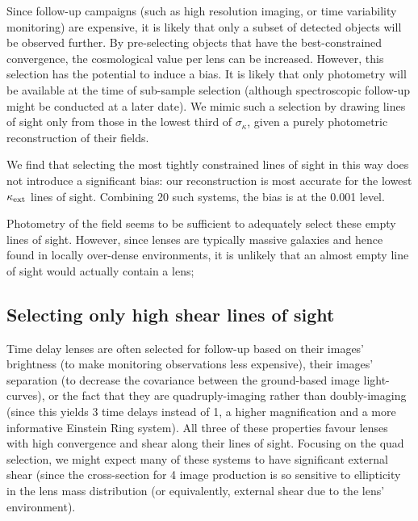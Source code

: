 \documentclass[useAMS,usenatbib,a4paper]{mn2e}
\begin{document}
Since follow-up campaigns (such as high resolution imaging, or time
variability monitoring) are expensive, it is likely that only a subset of
detected objects will be observed further. By pre-selecting objects that have 
the best-constrained convergence, the cosmological value per lens can be
increased. However, this selection 
has the potential to induce a bias. It is
likely that only photometry will be available at the time of sub-sample
selection (although spectroscopic follow-up might be conducted at a later
date). We mimic such a selection by drawing lines of sight only from those in
the lowest third of $\sigma_{\kappa}$, given a purely photometric
reconstruction of their fields. 

We find that selecting the most tightly constrained lines of sight in this way
does not introduce a significant bias:  our reconstruction is most accurate
for the lowest $\kappa_{\rm ext}$ lines of sight. Combining 20 such systems, the bias
is at the 0.001 level.

Photometry of the field seems to be sufficient to adequately select these
empty lines of sight.  However, 
since lenses are typically massive galaxies and hence found in locally over-dense
environments, it is unlikely that  an almost empty line of sight would
actually  contain a lens; 


\subsection{Selecting only high shear lines of sight}
\label{sec:bias:tightPDF}

Time delay lenses are often selected for follow-up based on their images'
brightness (to make monitoring observations less expensive), their images'
separation (to decrease the covariance between the ground-based image
light-curves), or the fact that they are quadruply-imaging rather than
doubly-imaging (since this yields 3 time delays instead of 1, a higher
magnification and a more informative Einstein Ring system). All three of these
properties favour lenses with high convergence and shear along their lines of
sight. Focusing on the quad selection, we might expect many of these systems
to have significant external shear (since the cross-section for 4 image
production is so sensitive to ellipticity in the lens mass distribution (or
equivalently, external shear due to the lens' environment). 
\end{document}
